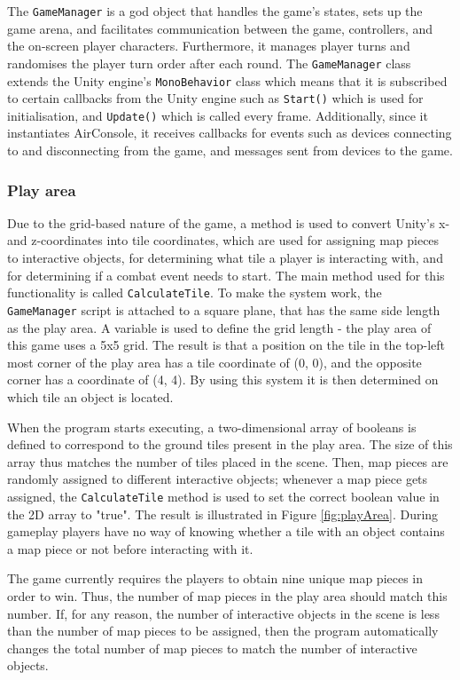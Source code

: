 The \texttt{GameManager} is a god object that handles the game’s states, sets up the game arena, and facilitates communication between the game,  controllers, and the on-screen player characters. Furthermore, it manages player turns and randomises the player turn order after each round. The \texttt{GameManager} class extends the Unity engine’s \texttt{MonoBehavior} class which means that it is subscribed to certain callbacks from the Unity engine such as \texttt{Start()} which is used for initialisation, and \texttt{Update()} which is called every frame. Additionally, since it instantiates AirConsole, it receives callbacks for events such as devices connecting to and disconnecting from the game, and messages sent from devices to the game. 

\subsubsection{Play area}\label{sec:playArea}
Due to the grid-based nature of the game, a method is used to convert Unity's x- and z-coordinates into tile coordinates, which are used for assigning map pieces to interactive objects, for determining what tile a player is interacting with, and for determining if a combat event needs to start. The main method used for this functionality is called \texttt{CalculateTile}. To make the system work, the \texttt{GameManager} script is attached to a square plane, that has the same side length as the play area. A variable is used to define the grid length - the play area of this game uses a 5x5 grid. The result is that a position on the tile in the top-left most corner of the play area has a tile coordinate of (0, 0), and the opposite corner has a coordinate of (4, 4). By using this system it is then determined on which tile an object is located.

When the program starts executing, a two-dimensional array of booleans is defined to correspond to the ground tiles present in the play area. The size of this array thus matches the number of tiles placed in the scene. Then, map pieces are randomly assigned to different interactive objects; whenever a map piece gets assigned, the \texttt{CalculateTile} method is used to set the correct boolean value in the 2D array to "true". The result is illustrated in Figure \ref{fig:playArea}. During gameplay players have no way of knowing whether a tile with an object contains a map piece or not before interacting with it.

The game currently requires the players to obtain nine unique map pieces in order to win. Thus, the number of map pieces in the play area should match this number. If, for any reason, the number of interactive objects in the scene is less than the number of map pieces to be assigned, then the program automatically changes the total number of map pieces to match the number of interactive objects.

